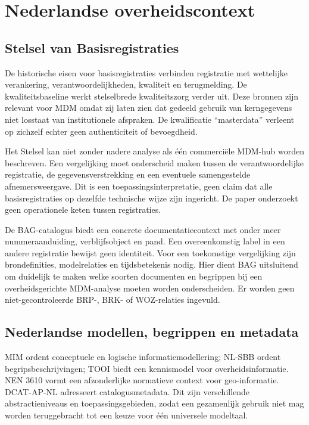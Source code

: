 \section{Nederlandse overheidscontext}
\subsection{Stelsel van Basisregistraties}
De historische eisen voor basisregistraties verbinden registratie met wettelijke verankering, verantwoordelijkheden, kwaliteit en terugmelding. De kwaliteitsbaseline werkt stelselbrede kwaliteitszorg verder uit. Deze bronnen zijn relevant voor MDM omdat zij laten zien dat gedeeld gebruik van kerngegevens niet losstaat van institutionele afspraken. De kwalificatie ``masterdata'' verleent op zichzelf echter geen authenticiteit of bevoegdheid. \parencite{S25,S26}

Het Stelsel kan niet zonder nadere analyse als één commerciële MDM-hub worden beschreven. Een vergelijking moet onderscheid maken tussen de verantwoordelijke registratie, de gegevensverstrekking en een eventuele samengestelde afnemersweergave. Dit is een toepassingsinterpretatie, geen claim dat alle basisregistraties op dezelfde technische wijze zijn ingericht. De paper onderzoekt geen operationele keten tussen registraties.

De BAG-catalogus biedt een concrete documentatiecontext met onder meer nummeraanduiding, verblijfsobject en pand. Een overeenkomstig label in een andere registratie bewijst geen identiteit. Voor een toekomstige vergelijking zijn brondefinities, modelrelaties en tijdsbetekenis nodig. Hier dient BAG uitsluitend om duidelijk te maken welke soorten documenten en begrippen bij een overheidsgerichte MDM-analyse moeten worden onderscheiden. Er worden geen niet-gecontroleerde BRP-, BRK- of WOZ-relaties ingevuld. \parencite{S49}

\subsection{Nederlandse modellen, begrippen en metadata}
MIM ordent conceptuele en logische informatiemodellering; NL-SBB ordent begripsbeschrijvingen; TOOI biedt een kennismodel voor overheidsinformatie. NEN 3610 vormt een afzonderlijke normatieve context voor geo-informatie. DCAT-AP-NL adresseert catalogusmetadata. Dit zijn verschillende abstractieniveaus en toepassingsgebieden, zodat een gezamenlijk gebruik niet mag worden teruggebracht tot een keuze voor één universele modeltaal. \parencite{S13,S14,S15,S17,S16}

